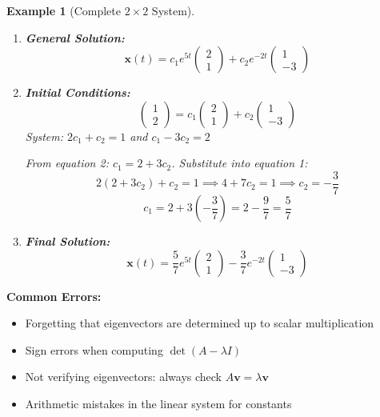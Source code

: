 \documentclass[12pt]{article}
\newtheorem{example}{Example}
\begin{document}
\begin{example}[Complete $2\times2$ System]
\begin{enumerate}
\item \textbf{General Solution:}
\[\mathbf{x}(t) = c_{1} e^{5t}\begin{pmatrix} 2 \\ 1 \end{pmatrix} + c_{2} e^{-2t}\begin{pmatrix} 1 \\ -3 \end{pmatrix}\]

\item \textbf{Initial Conditions:}
\[\begin{pmatrix} 1 \\ 2 \end{pmatrix} = c_{1}\begin{pmatrix} 2 \\ 1 \end{pmatrix} + c_{2}\begin{pmatrix} 1 \\ -3 \end{pmatrix}\]
System: $2c_{1} + c_{2} = 1$ and $c_{1} - 3c_{2} = 2$

From equation 2: $c_{1} = 2 + 3c_{2}$. Substitute into equation 1:
\[2(2 + 3c_{2}) + c_{2} = 1 \implies 4 + 7c_{2} = 1 \implies c_{2} = -\frac{3}{7}\]
\[c_{1} = 2 + 3(-\frac{3}{7}) = 2 - \frac{9}{7} = \frac{5}{7}\]

\item \textbf{Final Solution:}
\[\mathbf{x}(t) = \frac{5}{7}e^{5t}\begin{pmatrix} 2 \\ 1 \end{pmatrix} - \frac{3}{7}e^{-2t}\begin{pmatrix} 1 \\ -3 \end{pmatrix}\]
\end{enumerate}
\end{example}

\begin{warning}
\textbf{Common Errors:}
\begin{itemize}
\item Forgetting that eigenvectors are determined up to scalar multiplication
\item Sign errors when computing $\det(A - \lambda I)$
\item Not verifying eigenvectors: always check $A\mathbf{v} = \lambda\mathbf{v}$
\item Arithmetic mistakes in the linear system for constants
\end{itemize}
\end{warning}
\end{document}
